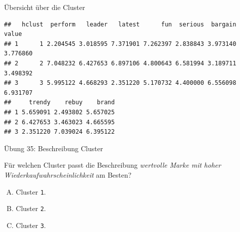\documentclass[12pt,ngerman,a4paper,ignorenonframetext,]{beamer}
\newenvironment{Shaded}{\begin{snugshade}}{\end{snugshade}}
\newcommand{\CommentTok}[1]{\textcolor[rgb]{0.56,0.35,0.01}{\textit{#1}}}
\newcommand{\DataTypeTok}[1]{\textcolor[rgb]{0.13,0.29,0.53}{#1}}
\newcommand{\DecValTok}[1]{\textcolor[rgb]{0.00,0.00,0.81}{#1}}
\newcommand{\KeywordTok}[1]{\textcolor[rgb]{0.13,0.29,0.53}{\textbf{#1}}}
\newcommand{\NormalTok}[1]{#1}
\newcommand{\OperatorTok}[1]{\textcolor[rgb]{0.81,0.36,0.00}{\textbf{#1}}}
\newcommand{\StringTok}[1]{\textcolor[rgb]{0.31,0.60,0.02}{#1}}
\providecommand{\tightlist}{%
  \setlength{\itemsep}{0pt}\setlength{\parskip}{0pt}}
\begin{document}
\begin{frame}{Übersicht über die Cluster}
\protect\hypertarget{ubersicht-uber-die-cluster}{}

\begin{Shaded}
\end{Shaded}

\begin{verbatim}
##   hclust  perform   leader   latest      fun  serious  bargain    value
## 1      1 2.204545 3.018595 7.371901 7.262397 2.838843 3.973140 3.776860
## 2      2 7.048232 6.427653 6.897106 4.800643 6.581994 3.189711 3.498392
## 3      3 5.995122 4.668293 2.351220 5.170732 4.400000 6.556098 6.931707
##     trendy    rebuy    brand
## 1 5.659091 2.493802 5.657025
## 2 6.427653 3.463023 4.665595
## 3 2.351220 7.039024 6.395122
\end{verbatim}

\end{frame}

\begin{frame}[fragile]{Übung 35: Beschreibung Cluster}
\protect\hypertarget{ubung-35-beschreibung-cluster}{}

Für welchen Cluster passt die Beschreibung \emph{wertvolle Marke mit
hoher Wiederkaufwahrscheinlichkeit} am Besten?

\begin{enumerate}
[A.]
\tightlist
\item
  Cluster \texttt{1}.
\item
  Cluster \texttt{2}.
\item
  Cluster \texttt{3}.
\end{enumerate}


\end{frame}
\end{document}

